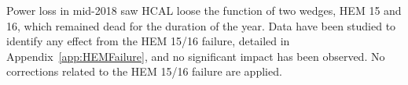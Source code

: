 Power loss in mid-2018 saw HCAL loose the function of two wedges, HEM 15 and 16, which remained dead for the duration of the year. Data have been studied to identify any effect from the HEM 15/16 failure, detailed in Appendix~\ref{app:HEMFailure}, and no significant impact has been observed. No corrections related to the HEM 15/16 failure are applied.